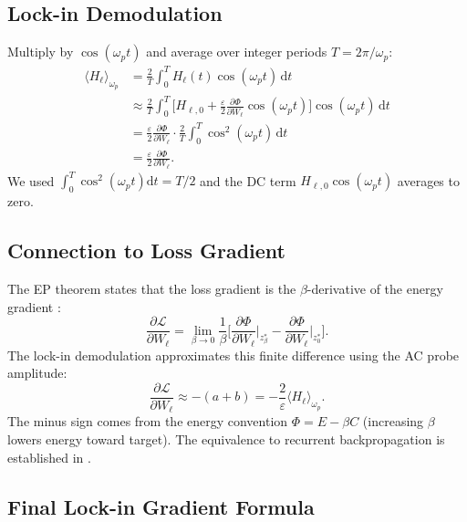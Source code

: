 \documentclass[11pt]{article}
\newcommand{\dd}{\mathrm{d}}
\begin{document}
\subsection{Lock-in Demodulation}

Multiply by $\cos(\omega_p t)$ and average over integer periods $T = 2\pi/\omega_p$:
\begin{align}
\langle H_\ell \rangle_{\omega_p}
&= \frac{2}{T}\int_0^T H_\ell(t) \cos(\omega_p t) \, \dd t \\
&\approx \frac{2}{T}\int_0^T \Big[ H_{\ell,0} + \frac{\varepsilon}{2}\frac{\partial \Phi}{\partial W_\ell}\cos(\omega_p t) \Big] \cos(\omega_p t) \, \dd t \\
&= \frac{\varepsilon}{2}\frac{\partial \Phi}{\partial W_\ell} \cdot \frac{2}{T}\int_0^T \cos^2(\omega_p t) \, \dd t \\
&= \frac{\varepsilon}{2}\frac{\partial \Phi}{\partial W_\ell}.
\end{align}
We used $\int_0^T \cos^2(\omega_p t) \dd t = T/2$ and the DC term $H_{\ell,0}\cos(\omega_p t)$ averages to zero.

\subsection{Connection to Loss Gradient}

The EP theorem states that the loss gradient is the $\beta$-derivative of the energy gradient \citep{scellier2017equilibrium,scellier2018equivalence}:
\begin{equation}
\frac{\partial \mathcal{L}}{\partial W_\ell} = \lim_{\beta\to 0} \frac{1}{\beta}\Big[
\frac{\partial \Phi}{\partial W_\ell}\big|_{z_\beta^*} - \frac{\partial \Phi}{\partial W_\ell}\big|_{z_0^*}
\Big].
\end{equation}
The lock-in demodulation approximates this finite difference using the AC probe amplitude:
\begin{equation}
\frac{\partial \mathcal{L}}{\partial W_\ell} \approx - (a+b) = -\frac{2}{\varepsilon} \langle H_\ell \rangle_{\omega_p}.
\end{equation}
The minus sign comes from the energy convention $\Phi = E - \beta C$ (increasing $\beta$ lowers energy toward target). The equivalence to recurrent backpropagation is established in \citep{scellier2018equivalence}.

\subsection{Final Lock-in Gradient Formula}
\end{document}
